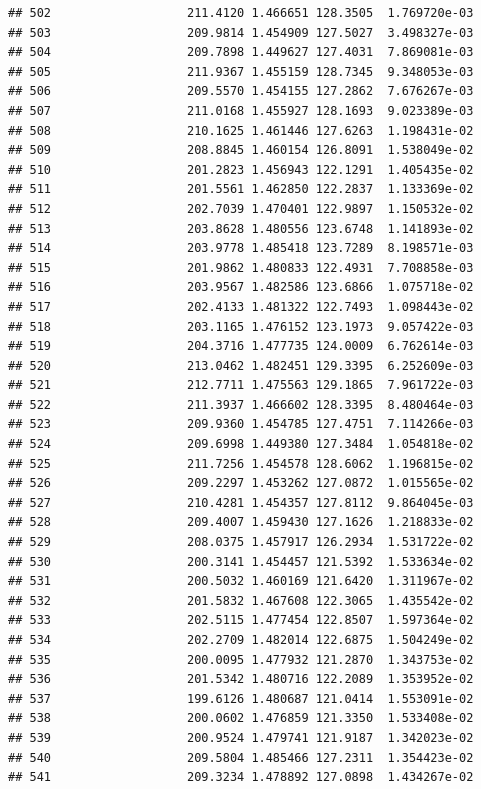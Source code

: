 \documentclass[
]{article}
\begin{document}
\begin{verbatim}
## 502                   211.4120 1.466651 128.3505  1.769720e-03
## 503                   209.9814 1.454909 127.5027  3.498327e-03
## 504                   209.7898 1.449627 127.4031  7.869081e-03
## 505                   211.9367 1.455159 128.7345  9.348053e-03
## 506                   209.5570 1.454155 127.2862  7.676267e-03
## 507                   211.0168 1.455927 128.1693  9.023389e-03
## 508                   210.1625 1.461446 127.6263  1.198431e-02
## 509                   208.8845 1.460154 126.8091  1.538049e-02
## 510                   201.2823 1.456943 122.1291  1.405435e-02
## 511                   201.5561 1.462850 122.2837  1.133369e-02
## 512                   202.7039 1.470401 122.9897  1.150532e-02
## 513                   203.8628 1.480556 123.6748  1.141893e-02
## 514                   203.9778 1.485418 123.7289  8.198571e-03
## 515                   201.9862 1.480833 122.4931  7.708858e-03
## 516                   203.9567 1.482586 123.6866  1.075718e-02
## 517                   202.4133 1.481322 122.7493  1.098443e-02
## 518                   203.1165 1.476152 123.1973  9.057422e-03
## 519                   204.3716 1.477735 124.0009  6.762614e-03
## 520                   213.0462 1.482451 129.3395  6.252609e-03
## 521                   212.7711 1.475563 129.1865  7.961722e-03
## 522                   211.3937 1.466602 128.3395  8.480464e-03
## 523                   209.9360 1.454785 127.4751  7.114266e-03
## 524                   209.6998 1.449380 127.3484  1.054818e-02
## 525                   211.7256 1.454578 128.6062  1.196815e-02
## 526                   209.2297 1.453262 127.0872  1.015565e-02
## 527                   210.4281 1.454357 127.8112  9.864045e-03
## 528                   209.4007 1.459430 127.1626  1.218833e-02
## 529                   208.0375 1.457917 126.2934  1.531722e-02
## 530                   200.3141 1.454457 121.5392  1.533634e-02
## 531                   200.5032 1.460169 121.6420  1.311967e-02
## 532                   201.5832 1.467608 122.3065  1.435542e-02
## 533                   202.5115 1.477454 122.8507  1.597364e-02
## 534                   202.2709 1.482014 122.6875  1.504249e-02
## 535                   200.0095 1.477932 121.2870  1.343753e-02
## 536                   201.5342 1.480716 122.2089  1.353952e-02
## 537                   199.6126 1.480687 121.0414  1.553091e-02
## 538                   200.0602 1.476859 121.3350  1.533408e-02
## 539                   200.9524 1.479741 121.9187  1.342023e-02
## 540                   209.5804 1.485466 127.2311  1.354423e-02
## 541                   209.3234 1.478892 127.0898  1.434267e-02

\end{verbatim}
\end{document}
